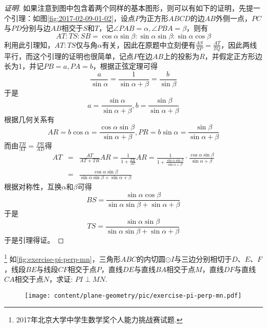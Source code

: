 \begin{proof}[证明]
  如果注意到图中包含着两个同样的基本图形，则可以有如下的证明，先提一个引理：如图\ref{fig:2017-02-09-01-02}，设点$P$为正方形$ABCD$的边$AB$外侧一点，$PC$与$PD$分别与边$AB$相交于$S$和$T$，记$\angle PAB=\alpha, \angle PBA=\beta$，则有
  \begin{equation*}
    AT : TS : SB = \cos{\alpha}\sin{\beta} : \sin{\alpha}\sin{\beta} : \sin{\alpha}\cos{\beta}
  \end{equation*}
  利用此引理知，$AT:TS$仅与角$\alpha$有关，因此在原题中立刻便有$\frac{AS}{SP}=\frac{AT}{TQ}$，因此两线平行，而这个引理的证明也很简单，记点$P$在边$AB$上的投影为$R$，并假定正方形边长为1，并记$PB=a, PA=b$，根据正弦定理可得 
  \begin{equation*}
    \frac{a}{\sin{\alpha}}=\frac{1}{\sin{\alpha+\beta}}=\frac{b}{\sin{\beta}}
  \end{equation*}
  于是
  \begin{equation*}
    a=\frac{\sin{\alpha}}{\sin{\alpha+\beta}}, b=\frac{\sin{\beta}}{\sin{\alpha+\beta}}
  \end{equation*}
  根据几何关系有
  \begin{equation*}
    AR=b\cos{\alpha}=\frac{\cos{\alpha}\sin{\beta}}{\sin{\alpha+\beta}}, PR=b\sin{\alpha}=\frac{\sin{\beta}}{\sin{\alpha+\beta}}
  \end{equation*}
  而由$\frac{TR}{AT}=\frac{PR}{AD}$得
  \begin{eqnarray*}
    AT &=& \frac{AT}{AT+TR}AR=\frac{1}{1+\frac{TR}{AT}}AR 
    = \frac{1}{1+\frac{\sin{\alpha}\sin{\beta}}{\sin{\alpha+\beta}}} \cdot \frac{\cos{\alpha}\sin{\beta}}{\sin{\alpha+\beta}} \\
    &=& \frac{\cos{\alpha}\sin{\beta}}{\sin{\alpha}\sin{\beta}+\sin{\alpha+\beta}}
  \end{eqnarray*}
  根据对称性，互换$\alpha$和$\beta$可得
  \begin{equation*}
    BS = \frac{\sin{\alpha}\cos{\beta}}{\sin{\alpha}\sin{\beta}+\sin{\alpha+\beta}}
  \end{equation*}
  于是
  \begin{equation*}
    TS = \frac{\sin{\alpha}\sin{\beta}}{\sin{\alpha}\sin{\beta}+\sin{\alpha+\beta}}
  \end{equation*}
  于是引理得证。
\end{proof}

\begin{exercise}\footnote{2017年北京大学中学生数学奖个人能力挑战赛试题.}
  如\autoref{fig:exercise-pi-perp-mn}，三角形$ABC$的内切圆$\odot I$与三边分别相切于$D$、$E$、$F$，线段$BE$与线段$CF$相交于点$P$，直线$DE$与直线$BA$相交于点$M$，直线$DF$与直线$CA$相交于点$N$，求证: $PI \perp MN$.
 
\begin{figure}[htbp]
  \centering
\texttt{[image: content/plane-geometry/pic/exercise-pi-perp-mn.pdf]}
\caption{}
\label{fig:exercise-pi-perp-mn}
\end{figure}

\end{exercise}

